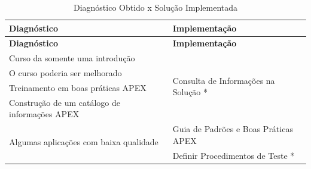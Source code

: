 \begin{longtable}{|m{8.0cm}|m{8.0cm}|}
\caption{Diagnóstico Obtido x Solução Implementada}
\label{diagnostico_x_solucao}\\
\hline
\textbf{Diagnóstico} & \textbf{Implementação} \\
\hline
\endfirsthead
\hline
\textbf{Diagnóstico} & \textbf{Implementação} \\
\hline
\endhead
Curso da somente uma introdução                                                                                                   & \multirow{4}{*}{Consulta de Informações na Solução *}                                                                                                                                                      \\ \cline{1-1}
O curso poderia ser melhorado                                                                                                     &                                                                                                                                                                                                            \\ \cline{1-1}
Treinamento em boas práticas APEX                                                                                                 &                                                                                                                                                                                                            \\ \cline{1-1}
Construção de um catálogo de informações APEX                                                                                     &                                                                                                                                                                                                            \\ \hline
\multirow{3}{*}{Algumas aplicações com baixa qualidade}                                                                           & Guia de Padrões e Boas Práticas APEX                                                                                                                                                                       \\ \cline{2-2} 
                                                                                                                                  & Definir Procedimentos de Teste *                                                                                                                                                                           \\ \cline{2-2} 

\end{longtable}
